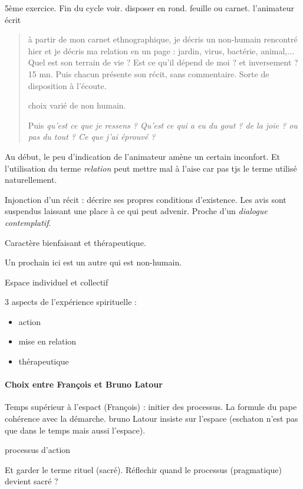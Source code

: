\begin{Ex}
    5ème exercice. Fin du cycle voir.
    disposer en rond. feuille ou carnet.
    l'animateur écrit
    \begin{quote}
        à partir de mon carnet ethnographique, je décris un non-humain rencontré hier et je décris ma relation en un page : jardin, virus, bactérie, animal,... 
        Quel est son terrain de vie ? Est ce qu'il dépend de moi ? et inversement ?
        15 mn. 
        Puis chacun présente son récit, sans commentaire.  Sorte de disposition à l'écoute.

 choix varié de non humain.

 Puis \textit{qu'est ce que je ressens ? Qu'est ce qui a eu du gout ? de la joie ? ou pas du tout ? Ce que j'ai éprouvé ? }
    \end{quote}

Au début, le peu d'indication de l'animateur amène un certain inconfort. Et l'utilisation du terme \textit{relation} peut mettre mal à l'aise car pas tjs le terme utilisé naturellement.

Injonction d'un récit : décrire ses propres conditions d'existence. Les avis sont suspendus laissant une place à ce qui peut advenir. 
Proche d'un \textit{dialogue contemplatif}.

Caractère bienfaisant et thérapeutique. 

Un prochain ici est un autre qui est non-humain. 

Espace individuel et collectif 

3 aspects de l'expérience spirituelle : 
\begin{itemize}
\item action
\item mise en relation
\item thérapeutique
\end{itemize}

\paragraph{Choix entre François et Bruno Latour} Temps supérieur à l'espact (François) : initier des processus. La formule du pape cohérence avec la démarche. 
bruno Latour insiste sur l'espace (eschaton n'est pas que dans le temps mais aussi l'espace). 


\end{Ex}

\begin{Def}[exercice]
processus  d'action
    
\end{Def}
Et garder le terme rituel (sacré). Réflechir quand le processus (pragmatique) devient sacré ?

